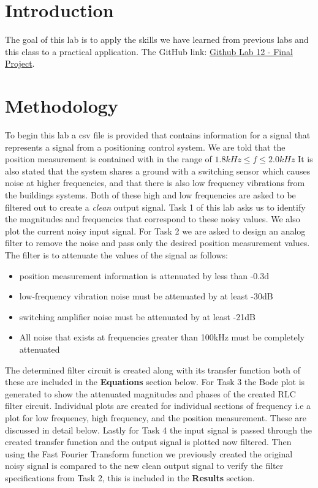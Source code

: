\documentclass[12pt]{report}
\begin{document}
\section{Introduction}
The goal of this lab is to apply the skills we have learned from previous labs and this class to a practical application.  
\newline \newline The GitHub link: \href{https://github.com/CDJohnson279}{Github Lab 12 - Final Project}. 

\section{Methodology}
To begin this lab a csv file is provided that contains information for a signal that represents a signal from a positioning control system. We are told that the position measurement is contained with in the range of $ 1.8kHz \le \textit{f} \le 2.0kHz$  It is also stated that the system shares a ground with a switching sensor which causes noise at higher frequencies, and that there is also low frequency vibrations from the buildings systems. Both of these high and low frequencies are asked to be filtered out to create a \textit{clean} output signal. Task 1 of this lab asks us to identify the magnitudes and frequencies that correspond to these noisy values. We also plot the current noisy input signal. \newline 
For Task 2 we are asked to design an analog filter to remove the noise and pass only the desired position measurement values. The filter is to attenuate the values of the signal as follows: 
\begin{itemize}
  \item  position measurement information is attenuated by less than -0.3d
  \item low-frequency vibration noise must be attenuated by at least -30dB
  \item switching amplifier noise must be attenuated by at least -21dB
  \item All noise that exists at frequencies greater than 100kHz must be completely attenuated
\end{itemize}
The determined filter circuit is created along with its transfer function both of these are included in the \textbf{Equations} section below. \newline
For Task 3 the Bode plot is generated to show the attenuated magnitudes and phases of the created RLC filter circuit. Individual plots are created for individual sections of frequency i.e a plot for low frequency, high frequency, and the position measurement. These are discussed in detail below. \newline
Lastly for Task 4 the input signal is passed through the created transfer function and the output signal is plotted now filtered. Then using the Fast Fourier Transform function we previously created the original noisy signal is compared to the new clean output signal to verify the filter specifications from Task 2, this is included in the \textbf{Results} section. 
\end{document}
